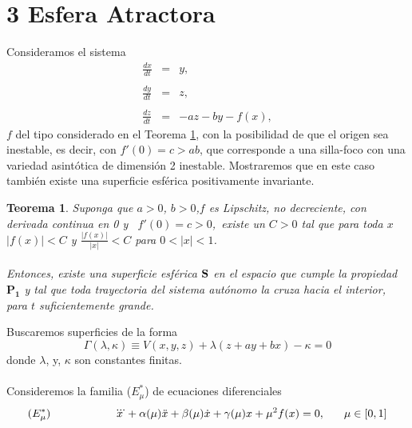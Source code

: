\documentclass[letter]{article}
\newtheorem{theo}{Teorema}
\begin{document}
\section{3 Esfera Atractora}
 
\color{black} Consideramos el sistema
\begin{equation}\label{Be2}
\begin{array}{lcl}
\displaystyle{\frac{dx}{dt}}&=&y,\\&&\\
\displaystyle{\frac{dy}{dt}}&=&z,\\&&\\
\displaystyle{\frac{dz}{dt}}&=&-az-by-f(x),
\end{array}
\end{equation}
$f$ del tipo considerado en el Teorema \ref{tsimo1}, con la
posibilidad de que el origen sea inestable, es decir, con
$f'(0)=c>ab$, que corresponde a una silla-foco con una variedad
asint{\'o}tica de dimensi{\'o}n 2 inestable. Mostraremos que en este caso
tambi{\'e}n existe una superficie esf{\'e}rica positivamente invariante.
\begin{theo}\label{tsimo1}Suponga que $a>0$,\hspace{0.5cm}
$b>0$,\hspace{0.5cm}$f$ es Lipschitz, no decreciente, con derivada
continua en 0 y \, $f'(0)=c>0$,\, existe un $C>0$ tal que para
toda $x$\quad $|f(x)|<C$ y $\displaystyle{\frac{|f(x)|}{|x|}}<C$
para $0<|x|<1$.
\\
\\
Entonces, existe una superficie esf{\'e}rica  ${\bf{S}}$ en el espacio
que cumple la propiedad $\mathbf{P_1}$ y tal que toda trayectoria
del sistema aut{\'o}nomo la cruza hacia el interior, para $t$
suficientemente grande.
\end{theo}
Buscaremos superficies de la forma
\begin{equation}\label{Be3}
\Gamma(\lambda,\kappa)\equiv V(x,y,z)+\lambda(z+ay+bx)-\kappa=0
\end{equation}
donde $\lambda$, y, $\kappa$ son constantes finitas.
\\
\\
Consideremos la familia ($E^*_{\mu}$) de ecuaciones diferenciales
\\
$$(E^*_{\mu})\hspace{2cm}\dddot{x}+\alpha(\mu)\ddot{x}+\beta(\mu)\dot{x}+\gamma(\mu)x+\mu^2f(x)=0,\hspace{0.6cm}\mu\in[0,1]$$
\\
\end{document}
